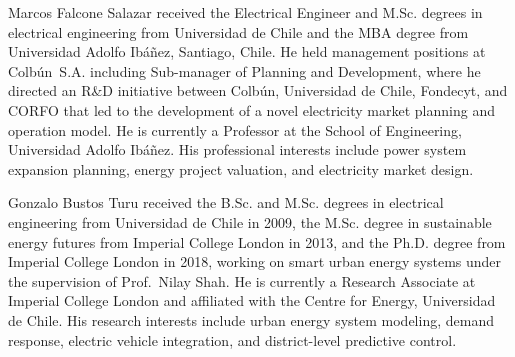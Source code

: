 \documentclass[journal]{IEEEtran}
\begin{document}
\begin{IEEEbiography}{Marcos Falcone Salazar}
  received the Electrical Engineer and M.Sc. degrees in electrical
  engineering from Universidad de Chile and the MBA degree from
  Universidad Adolfo Ib\'a\~nez, Santiago, Chile.  He held management
  positions at Colb\'un~S.A. including Sub-manager of Planning and
  Development, where he directed an R\&D initiative between Colb\'un,
  Universidad de Chile, Fondecyt, and CORFO that led to the development
  of a novel electricity market planning and operation model.  He is
  currently a Professor at the School of Engineering, Universidad Adolfo
  Ib\'a\~nez.  His professional interests include power system expansion
  planning, energy project valuation, and electricity market design.
\end{IEEEbiography}

\begin{IEEEbiography}{Gonzalo Bustos Turu}
  received the B.Sc. and M.Sc. degrees in electrical engineering from
  Universidad de Chile in 2009, the M.Sc. degree in sustainable energy
  futures from Imperial College London in 2013, and the Ph.D. degree
  from Imperial College London in 2018, working on smart urban energy
  systems under the supervision of Prof.~Nilay Shah.  He is currently
  a Research Associate at Imperial College London and affiliated with
  the Centre for Energy, Universidad de Chile.  His research interests
  include urban energy system modeling, demand response, electric vehicle
  integration, and district-level predictive control.
\end{IEEEbiography}
\end{document}
